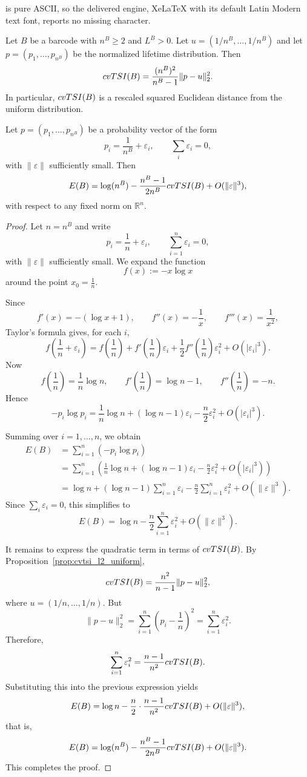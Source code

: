 \documentclass[10pt,a4paper]{amsart}
\newcommand{\tsi}[0]{\textup{TSI}}
\begin{document}
is pure ASCII, so the delivered engine, XeLaTeX with its default Latin Modern text font, reports no missing character.
\begin{prop}\label{prop:cvtsi_l2_uniform}
Let $B$ be a barcode with $n^B\geq 2$ and $L^B>0$. Let $u=(1/n^B,\dots,1/n^B)$ and let $p=(p_1,\dots,p_{n^B})$ be the normalized lifetime distribution. Then
\[
cv\tsi(B)=\frac{(n^B)^2}{n^B-1}\|p-u\|_2^2.
\]
In particular, $cv\tsi(B)$ is a rescaled squared Euclidean distance from the uniform distribution.
\end{prop}

\begin{prop}\label{prop:entropy_expansion}
Let $p=(p_1,\dots,p_{n^B})$ be a probability vector of the form
\[
p_i=\frac{1}{n^B}+\varepsilon_i,
\qquad
\sum_i \varepsilon_i=0,
\]
with $\|\varepsilon\|$ sufficiently small. Then
\[
E(B)=\log(n^B)-\frac{n^B-1}{2n^B}cv\tsi(B)+O(\|\varepsilon\|^3),
\]
with respect to any fixed norm on $\mathbb{R}^n$.
\end{prop}

\begin{proof}
Let $n=n^B$ and write
\[
p_i=\frac{1}{n}+\varepsilon_i,
\qquad
\sum_{i=1}^n \varepsilon_i=0,
\]
with $\|\varepsilon\|$ sufficiently small. We expand the function
\[
f(x):=-x\log x
\]
around the point $x_0=\frac{1}{n}$.

Since
\[
f'(x)=-(\log x+1),
\qquad
f''(x)=-\frac{1}{x},
\qquad
f'''(x)=\frac{1}{x^2},
\]
Taylor's formula gives, for each $i$,
\[
f\!\left(\frac{1}{n}+\varepsilon_i\right)
=
f\!\left(\frac{1}{n}\right)
+
f'\!\left(\frac{1}{n}\right)\varepsilon_i
+
\frac12 f''\!\left(\frac{1}{n}\right)\varepsilon_i^2
+
O(|\varepsilon_i|^3).
\]
Now
\[
f\!\left(\frac{1}{n}\right)=\frac{1}{n}\log n,
\qquad
f'\!\left(\frac{1}{n}\right)=\log n-1,
\qquad
f''\!\left(\frac{1}{n}\right)=-n.
\]
Hence
\[
-p_i\log p_i
=
\frac{1}{n}\log n
+
(\log n-1)\varepsilon_i
-\frac{n}{2}\varepsilon_i^2
+
O(|\varepsilon_i|^3).
\]

Summing over $i=1,\dots,n$, we obtain
\begin{align*}
E(B)
&=
\sum_{i=1}^n \left(-p_i\log p_i\right)\\
&=
\sum_{i=1}^n
\left(
\frac{1}{n}\log n
+
(\log n-1)\varepsilon_i
-\frac{n}{2}\varepsilon_i^2
+
O(|\varepsilon_i|^3)
\right)\\
&=
\log n
+
(\log n-1)\sum_{i=1}^n \varepsilon_i
-\frac{n}{2}\sum_{i=1}^n \varepsilon_i^2
+
O(\|\varepsilon\|^3).
\end{align*}
Since $\sum_i \varepsilon_i=0$, this simplifies to
\[
E(B)=\log n-\frac{n}{2}\sum_{i=1}^n \varepsilon_i^2+O(\|\varepsilon\|^3).
\]

It remains to express the quadratic term in terms of $cv\tsi(B)$. By Proposition~\ref{prop:cvtsi_l2_uniform},
\[
cv\tsi(B)=\frac{n^2}{n-1}\|p-u\|_2^2,
\]
where $u=(1/n,\dots,1/n)$. But
\[
\|p-u\|_2^2=\sum_{i=1}^n \left(p_i-\frac{1}{n}\right)^2
=\sum_{i=1}^n \varepsilon_i^2.
\]
Therefore,
\[
\sum_{i=1}^n \varepsilon_i^2=\frac{n-1}{n^2}cv\tsi(B).
\]
Substituting this into the previous expression yields
\[
E(B)
=
\log n
-\frac{n}{2}\cdot \frac{n-1}{n^2}cv\tsi(B)
+
O(\|\varepsilon\|^3),
\]
that is,
\[
E(B)=\log(n^B)-\frac{n^B-1}{2n^B}cv\tsi(B)+O(\|\varepsilon\|^3).
\]
This completes the proof.
\end{proof}
\end{document}
